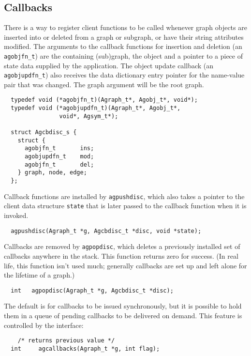 \documentclass[11pt,letterpaper]{article}
\begin{document}
\subsection{Callbacks}
\label{subsec:callbacks}

There is a way to register client functions to be called
whenever graph objects are inserted into or deleted from a graph or subgraph,
or have their string attributes modified. 
The arguments to the callback functions for insertion and
deletion (an \verb"agobjfn_t") are the containing (sub)graph, the object and a pointer
to a piece of state data supplied by the application.
The object update callback (an \verb"agobjupdfn_t") also
receives the data dictionary entry pointer for the
name-value pair that was changed.
The graph argument will be the root graph.

\begin{verbatim}
  typedef void (*agobjfn_t)(Agraph_t*, Agobj_t*, void*);
  typedef void (*agobjupdfn_t)(Agraph_t*, Agobj_t*, 
                void*, Agsym_t*);

  struct Agcbdisc_s {
    struct {
      agobjfn_t       ins;
      agobjupdfn_t    mod;
      agobjfn_t       del;
    } graph, node, edge;
  };
\end{verbatim}

Callback functions are installed by \verb"agpushdisc", which also takes
a pointer to the client data structure \verb"state" that is
later passed to the callback function when it is invoked.

\begin{verbatim}
  agpushdisc(Agraph_t *g, Agcbdisc_t *disc, void *state);
\end{verbatim}

Callbacks are removed by \verb"agpopdisc", which deletes a
previously installed set of callbacks anywhere in the stack.
This function returns zero for success.  (In real life, this
function isn't used much; generally callbacks are set up and
left alone for the lifetime of a graph.)

\begin{verbatim}
  int   agpopdisc(Agraph_t *g, Agcbdisc_t *disc);
\end{verbatim}

The default is for callbacks to be issued synchronously, but it is 
possible to hold them in a queue of pending callbacks to be delivered
on demand.  This feature is controlled by the interface:

\begin{verbatim}
    /* returns previous value */
  int     agcallbacks(Agraph_t *g, int flag); 
\end{verbatim}
\end{document}
